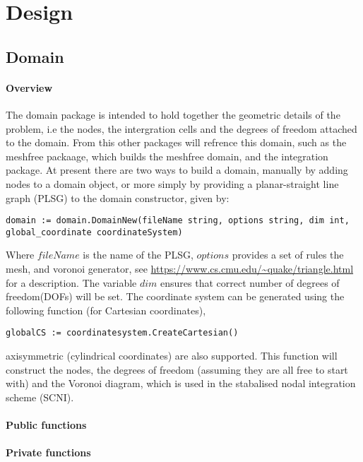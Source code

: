 \chapter{Design}
\section{Domain}

\subsubsection*{Overview}
The domain package is intended to hold together the geometric details of the problem, i.e the nodes, the intergration cells and the degrees of freedom attached to the domain. From this other packages will refrence this domain, such as the meshfree packaage, which builds the meshfree domain, and the integration package. At present there are two ways to build a domain, manually by adding nodes to a domain object, or more simply by providing a planar-straight line graph (PLSG) to the domain constructor, given by:
\begin{tcolorbox}
\begin{lstlisting}
domain := domain.DomainNew(fileName string, options string, dim int, global_coordinate coordinateSystem)
\end{lstlisting}
\end{tcolorbox}

Where $fileName$ is the name of the PLSG, $options$ provides a set of rules the mesh, and voronoi generator, see \url{https://www.cs.cmu.edu/~quake/triangle.html} for a description. The variable $dim$ ensures that correct number of degrees of freedom(DOFs) will be set. The coordinate system can be generated using the following function (for Cartesian coordinates),
\begin{lstlisting}
globalCS := coordinatesystem.CreateCartesian()
\end{lstlisting}
axisymmetric (cylindrical coordinates) are also supported. This function will construct the nodes, the degrees of freedom (assuming they are all free to start with) and the Voronoi diagram, which is used in the stabalised nodal integration scheme (SCNI).

\subsubsection*{Public functions}

\subsubsection*{Private functions}